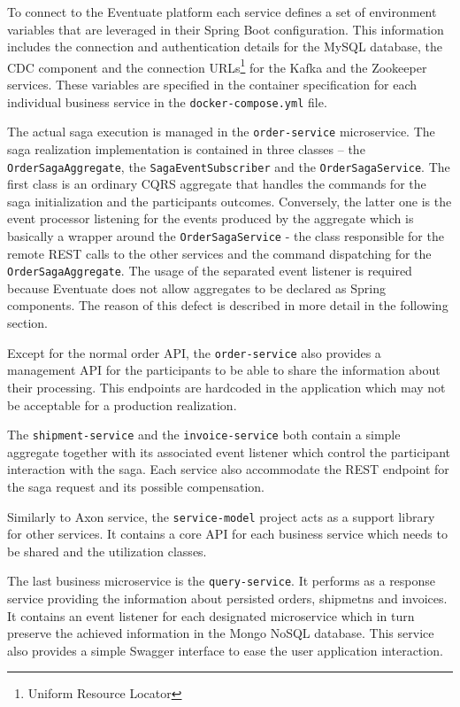 \documentclass[oneside,
  digital, %
  table,   %
  nolof,     %
  nolot,     %
]{fithesis3}
\begin{document}
To connect to the Eventuate platform each service defines a set of environment variables that are leveraged in their Spring Boot configuration. This information includes the connection and authentication details for the MySQL database, the CDC component and the connection URLs\footnote{Uniform Resource Locator} for the Kafka and the Zookeeper services. These variables are specified in the container specification for each individual business service in the \texttt{docker-compose.yml} file.

The actual saga execution is managed in the \texttt{order-service} microservice. The saga realization implementation is contained in three classes -- the \texttt{OrderSagaAggregate}, the \texttt{SagaEventSubscriber} and the \texttt{OrderSagaService}. The first class is an ordinary CQRS aggregate that handles the commands for the saga initialization and the participants outcomes. Conversely, the latter one is the event processor listening for the events produced by the aggregate which is basically a wrapper around the \texttt{OrderSagaService} - the class responsible for the remote REST calls to the other services and the command dispatching for the \texttt{OrderSagaAggregate}. The usage of the separated event listener is required because Eventuate does not allow aggregates to be declared as Spring components. The reason of this defect is described in more detail in the following section.

Except for the normal order API, the \texttt{order-service} also provides a management API for the participants to be able to share the information about their processing. This endpoints are hardcoded in the application which may not be acceptable for a production realization.

The \texttt{shipment-service} and the \texttt{invoice-service} both contain a simple aggregate together with its associated event listener which control the participant interaction with the saga. Each service also accommodate the REST endpoint for the saga request and its possible compensation.

Similarly to Axon service, the \texttt{service-model} project acts as a support library for other services. It contains a core API for each business service which needs to be shared and the utilization classes.

The last business microservice is the \texttt{query-service}. It performs as a response service providing the information about persisted orders, shipmetns and invoices. It contains an event listener for each designated microservice which in turn preserve the achieved information in the Mongo NoSQL database. This service also provides a simple Swagger interface to ease the user application interaction.
\end{document}

